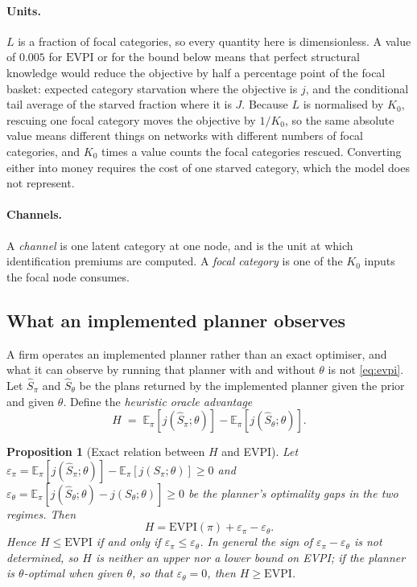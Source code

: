\documentclass[pdflatex,sn-mathphys-num]{sn-jnl}
\theoremstyle{thmstyleone}
\newtheorem{proposition}[theorem]{Proposition}
\theoremstyle{thmstyletwo}
\theoremstyle{thmstylethree}
\newcommand{\evpi}{\mathrm{EVPI}}
\begin{document}
\paragraph{Units.} $L$ is a fraction of focal categories, so every quantity
here is dimensionless. A value of $0.005$ for $\evpi$ or for the bound below
means that perfect structural knowledge would reduce the objective by half a
percentage point of the focal basket: expected category starvation where the
objective is $j$, and the conditional tail average of the starved fraction
where it is $J$. Because $L$ is normalised by $K_0$, rescuing one focal
category moves the objective by $1/K_0$, so the same absolute value means
different things on networks with different numbers of focal categories, and
$K_0$ times a value counts the focal categories rescued. Converting either
into money requires the cost of one starved category, which the model does
not represent.

\paragraph{Channels.} A \emph{channel} is one latent category at one node, and
is the unit at which identification premiums are computed. A \emph{focal
category} is one of the $K_0$ inputs the focal node consumes.

\subsection{What an implemented planner observes}

A firm operates an implemented planner rather than an exact optimiser, and
what it can observe by running that planner with and without $\theta$ is
not \eqref{eq:evpi}. Let
$\hat S_\pi$ and $\hat S_\theta$ be the plans returned by the implemented
planner given the prior and given $\theta$. Define the \emph{heuristic
oracle advantage}
\begin{equation}
H \;=\; \mathbb{E}_\pi\!\left[j(\hat S_\pi;\theta)\right]
      -\mathbb{E}_\pi\!\left[j(\hat S_\theta;\theta)\right].
\label{eq:H}
\end{equation}

\begin{proposition}[Exact relation between $H$ and EVPI]\label{prop:H}
Let $\varepsilon_\pi=\mathbb{E}_\pi[j(\hat S_\pi;\theta)]
-\mathbb{E}_\pi[j(S_\pi;\theta)]\ge0$ and
$\varepsilon_\theta=\mathbb{E}_\pi[j(\hat S_\theta;\theta)
-j(S_\theta;\theta)]\ge0$ be the planner's optimality gaps in the two
regimes. Then
\begin{equation}
H=\evpi(\pi)+\varepsilon_\pi-\varepsilon_\theta .
\label{eq:Hrelation}
\end{equation}
Hence $H\le\evpi$ if and only if $\varepsilon_\pi\le\varepsilon_\theta$. In
general the sign of $\varepsilon_\pi-\varepsilon_\theta$ is not determined,
so $H$ is neither an upper nor a lower bound on EVPI; if the planner is
$\theta$-optimal when given $\theta$, so that $\varepsilon_\theta=0$, then
$H\ge\evpi$.
\end{proposition}
\end{document}
